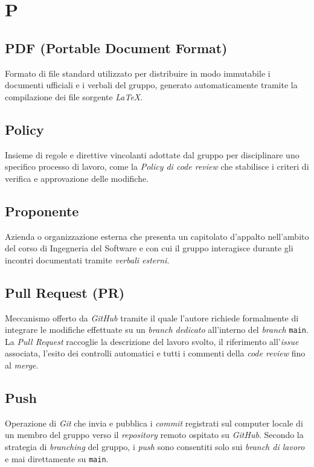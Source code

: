 \documentclass[11pt, a4paper]{article}
\begin{document}
\section*{P}

\subsection*{PDF (Portable Document Format)}
Formato di file standard utilizzato per distribuire in modo immutabile i documenti ufficiali e i verbali del gruppo, generato automaticamente tramite la compilazione dei file sorgente \textit{LaTeX}.

\subsection*{Policy}
Insieme di regole e direttive vincolanti adottate dal gruppo per disciplinare uno specifico processo di lavoro, come la \textit{Policy di code review} che stabilisce i criteri di verifica e approvazione delle modifiche.

\subsection*{Proponente}
Azienda o organizzazione esterna che presenta un capitolato d'appalto nell'ambito del corso di Ingegneria del Software e con cui il gruppo interagisce durante gli incontri documentati tramite \textit{verbali esterni}.

\subsection*{Pull Request (PR)}
Meccanismo offerto da \textit{GitHub} tramite il quale l'autore richiede formalmente di integrare le modifiche effettuate su un \textit{branch dedicato} all'interno del \textit{branch} \texttt{main}. La \textit{Pull Request} raccoglie la descrizione del lavoro svolto, il riferimento all'\textit{issue} associata, l'esito dei controlli automatici e tutti i commenti della \textit{code review} fino al \textit{merge}.

\subsection*{Push}
Operazione di \textit{Git} che invia e pubblica i \textit{commit} registrati sul computer locale di un membro del gruppo verso il \textit{repository} remoto ospitato su \textit{GitHub}. Secondo la strategia di \textit{branching} del gruppo, i \textit{push} sono consentiti solo sui \textit{branch di lavoro} e mai direttamente su \texttt{main}.
\end{document}
